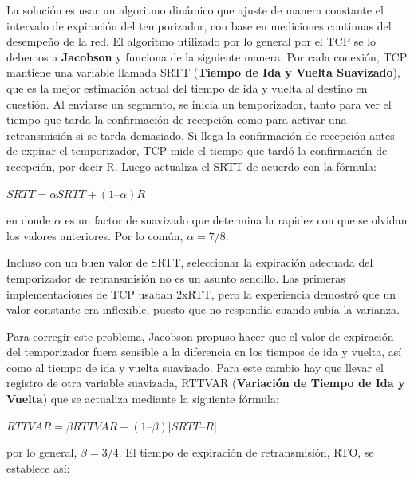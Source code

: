 \documentclass[10pt,a4paper]{report}
\begin{document}
	\par La solución es usar un algoritmo dinámico que ajuste de manera constante el intervalo de expiración del temporizador, con base en mediciones continuas del desempeño de la red. El algoritmo utilizado por lo general por el TCP se lo debemos a \textbf{Jacobson} y funciona de la siguiente manera. Por cada conexión, TCP mantiene una variable llamada SRTT (\textbf{Tiempo de Ida y Vuelta Suavizado}), que es la mejor estimación actual del tiempo de ida y vuelta al destino en cuestión. Al enviarse un segmento, se inicia un temporizador, tanto para ver el tiempo que tarda la confirmación de recepción como para activar una retransmisión si se tarda demasiado. Si llega la confirmación de recepción antes de expirar el temporizador, TCP mide el tiempo que tardó la confirmación de recepción, por decir R. Luego actualiza el SRTT de acuerdo con la fórmula:
	
	\begin{center}
		$ SRTT =   \alpha SRTT + (1 – \alpha ) R $
	\end{center}

	\par en donde $\alpha$ es un factor de suavizado que determina la rapidez con que se olvidan los valores anteriores. Por lo común, $\alpha = 7/8$.

	\par Incluso con un buen valor de SRTT, seleccionar la expiración adecuada del temporizador de retransmisión no es un asunto sencillo. Las primeras implementaciones de TCP usaban 2xRTT, pero la experiencia demostró que un valor constante era inflexible, puesto que no respondía cuando subía la varianza.

	\par Para corregir este problema, Jacobson propuso hacer que el valor de expiración del temporizador fuera sensible a la diferencia en los tiempos de ida y vuelta, así como al tiempo de ida y vuelta suavizado. Para este cambio hay que llevar el registro de otra variable suavizada, RTTVAR (\textbf{Variación de Tiempo de Ida y Vuelta}) que se actualiza mediante la siguiente fórmula:

	\begin{center}
		$ RTTVAR = \beta RTTVAR + (1 – \beta) | SRTT – R | $
	\end{center}	 

	\par por lo general, $\beta = 3/4$. El tiempo de expiración de retransmisión,
RTO, se establece así:
\end{document}
